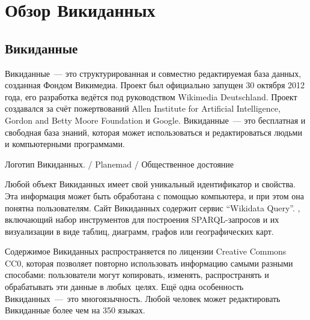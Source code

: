 \chapter{Обзор Викиданных}
\label{ch:ReviewAboutWD}

\section{Викиданные}

Викиданные~--- это структурированная и совместно редактируемая база данных, созданная Фондом Викимедиа\footnotemark.  Проект был официально запущен 30 октября 2012 года, его разработка ведётся под руководством Wikimedia Deutschland\footnotemark.  Проект создавался за счёт пожертвований Allen Institute for Artificial Intelligence, Gordon and Betty Moore Foundation и Google. Викиданные~--- это бесплатная и свободная база знаний, которая может использоваться и редактироваться людьми и компьютерными программами\cite{Vrandecic}.\begin{marginfigure}[0.0cm]
{
	\setlength{\fboxsep}{0pt}%
	\setlength{\fboxrule}{1pt}%
}
\caption
{Логотип Викиданных.  / Planemad / Общественное достояние
}
\label{fig:seyu}
\end{marginfigure}

Любой объект Викиданных имеет свой уникальный идентификатор и свойства. Эта информация может быть обработана с помощью компьютера, и при этом она понятна пользователям. Сайт Викиданных содержит сервис ``Wikidata Query''\footnotemark. , включающий набор инструментов для построения SPARQL-запросов и их визуализации в виде таблиц, диаграмм, графов или географических карт.

Содержимое Викиданных распространяется по лицензии Creative Commons CC0, которая позволяет повторно использовать информацию самыми разными способами: пользователи могут копировать, изменять, распространять и обрабатывать эти данные в любых целях. Ещё одна особенность Викиданных~--- это многоязычность. Любой человек может редактировать Викиданные более чем на 350 языках.

